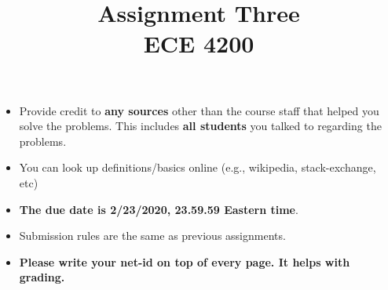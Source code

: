 \documentclass[11pt]{article}
\title{Assignment Three\\ ECE 4200}
\date{}
\begin{document}
\maketitle 

\begin{itemize}
\item
Provide credit to \textbf{any sources} other than the course staff that helped you solve the problems. This includes \textbf{all students} you talked to regarding the problems. 	
\item
You can look up definitions/basics online (e.g., wikipedia, stack-exchange, etc)
\item
{\bf The due date is 2/23/2020, 23.59.59 Eastern time}. 
\item
Submission rules are the same as previous assignments.
\item
\textbf{Please write your net-id on top of every page. It helps with grading.}
\end{itemize}
\end{document}

